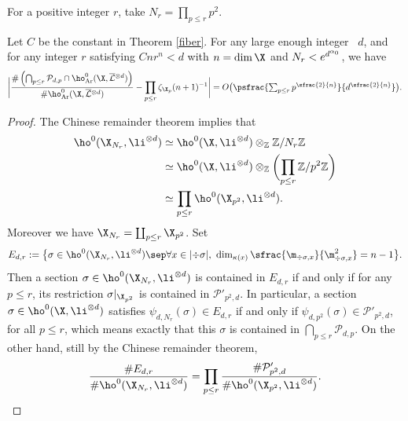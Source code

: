 For a positive integer $r$, take $N_r=\prod_{p\leq r}p^2$.
\begin{lem}\label{many}
Let $C$ be the constant in Theorem \ref{fiber}. For any large enough integer~ $d$, and for any integer $r$ satisfying $Cnr^n<d$ with $n=\dim \X$ and $N_r<\nobreak e^{d^{\alpha_0}}$, we have
\[
\biggl| \frac{\#\left(\bigcap_{p\leq r}\mathcal{P}_{d,p}\cap \ho^0_{\mathrm{Ar}}(\X, \overline{\mathcal{L}}{}^{\otimes d})\right)}{\#\ho^0_{\mathrm{Ar}}(\X, \overline{\mathcal{L}}{}^{\otimes d})} -\prod_{p\leq r}\zeta_{\X_p}(n+1)^{-1} \biggr| =O\bigl(\psfrac{\textstyle\sum_{p\leq r}p^{\sfrac{2}{n}}}{d^{\sfrac{2}{n}}} \bigr).
\]
\end{lem}
\begin{proof}
The Chinese remainder theorem implies that
\begin{align*}
\ho^0(\X_{N_r}, \li^{\otimes d}) &\simeq  \ho^0(\X, \li^{\otimes d})\otimes_{\mathbb{Z}}\mathbb{Z}/N_r\mathbb{Z} \\
&\simeq \ho^0(\X, \li^{\otimes d})\otimes_{\mathbb{Z}}\biggl(\prod_{p\leq r}\mathbb{Z}/p^2\mathbb{Z}\biggr)\\
&\simeq \prod_{p\leq r}\ho^0(\X_{p^2}, \li^{\otimes d}).
\end{align*}
Moreover we have $\X_{N_r}=\coprod_{p\leq r}\X_{p^2}$. Set
\[
E_{d,r}:=\bigl\{ \sigma\in \ho^0(\X_{N_r}, \li^{\otimes d})\sep \forall x\in |{\div\sigma}|,\ \dim_{\kappa(x)}\sfrac{\m_{\div \sigma,x}}{\m^2_{\div \sigma, x}}=n-1 \bigr\}.
\]
Then a section $\sigma\in \ho^0(\X_{N_r}, \li^{\otimes d})$ is contained in $E_{d,r}$ if and only if for any $p\leq r$, its restriction $\sigma|_{\X_{p^2}}$ is contained in $\mathcal{P}'_{p^2,d}$. In particular, a section $\sigma \in \ho^0(\X, \li^{\otimes d})$ satisfies $\psi_{d,N_r}(\sigma)\in E_{d,r}$ if and only if $\psi_{d,p^2}(\sigma)\in \mathcal{P}'_{p^2,d}$, for all $p\leq r$, which means exactly that this $\sigma$ is contained in $ \bigcap_{p\leq r}\mathcal{P}_{d,p}$. On the other hand, still by the Chinese remainder theorem,
\[
\frac{\#E_{d,r}}{\#\ho^0(\X_{N_r}, \li^{\otimes d})}=\prod_{p\leq r} \frac{\#\mathcal{P}'_{p^2,d}}{\#\ho^0(\X_{p^2}, \li^{\otimes d})}.
\]


\end{proof}
